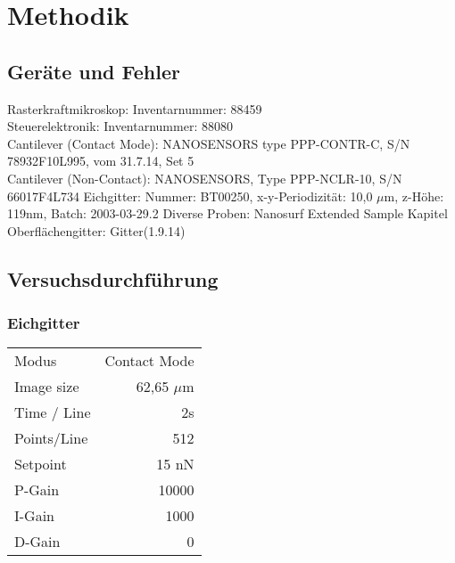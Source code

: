 

\def\skalierung{0.65}

\chapter{Methodik}
\label{chap:protokoll}

\section{Geräte und Fehler}

Rasterkraftmikroskop: Inventarnummer: 88459\\
Steuerelektronik: Inventarnummer: 88080\\
Cantilever (Contact Mode): NANOSENSORS type PPP-CONTR-C, S/N 78932F10L995, vom 31.7.14, Set 5\\
Cantilever (Non-Contact): NANOSENSORS, Type PPP-NCLR-10, S/N 66017F4L734
Eichgitter: Nummer: BT00250, x-y-Periodizität: 10,0 $\mu$m, z-Höhe: 119nm, Batch: 2003-03-29.2
Diverse Proben: Nanosurf Extended Sample Kapitel\\
Oberflächengitter: Gitter(1.9.14)



\section{Versuchsdurchführung}

\subsection{Eichgitter}
\begin{center}
    \centering
    \begin{tabular}{l|r}
        Modus & Contact Mode \\
        Image size & 62,65 $\mu$m \\
        Time / Line & 2s \\
        Points/Line & 512\\
        Setpoint & 15 nN \\
        P-Gain & 10000 \\
        I-Gain & 1000 \\
        D-Gain & 0 \\
        
    \end{tabular}
\end{center}

